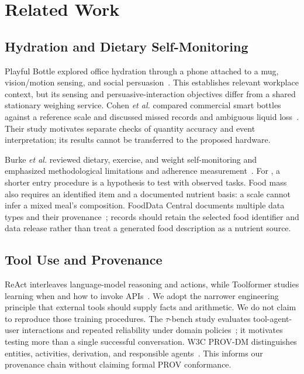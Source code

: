 \section{Related Work}\label{sec:related}
\subsection{Hydration and Dietary Self-Monitoring}
Playful Bottle explored office hydration through a phone attached to a mug, vision/motion sensing, and social persuasion~\cite{chiu2009}. This establishes relevant workplace context, but its sensing and persuasive-interaction objectives differ from a shared stationary weighing service. Cohen \textit{et al.} compared commercial smart bottles against a reference scale and discussed missed records and ambiguous liquid loss~\cite{cohen2022}. Their study motivates separate checks of quantity accuracy and event interpretation; its results cannot be transferred to the proposed hardware.

Burke \textit{et al.} reviewed dietary, exercise, and weight self-monitoring and emphasized methodological limitations and adherence measurement~\cite{burke2011}. For \sys{}, a shorter entry procedure is a hypothesis to test with observed tasks. Food mass also requires an identified item and a documented nutrient basis: a scale cannot infer a mixed meal's composition. FoodData Central documents multiple data types and their provenance~\cite{usda}; records should retain the selected food identifier and data release rather than treat a generated food description as a nutrient source.

\subsection{Tool Use and Provenance}
ReAct interleaves language-model reasoning and actions, while Toolformer studies learning when and how to invoke APIs~\cite{yao2023react,schick2023}. We adopt the narrower engineering principle that external tools should supply facts and arithmetic. We do not claim to reproduce those training procedures. The $\tau$-bench study evaluates tool-agent-user interactions and repeated reliability under domain policies~\cite{yao2024tau}; it motivates testing more than a single successful conversation. W3C PROV-DM distinguishes entities, activities, derivation, and responsible agents~\cite{prov}. This informs our provenance chain without claiming formal PROV conformance.

